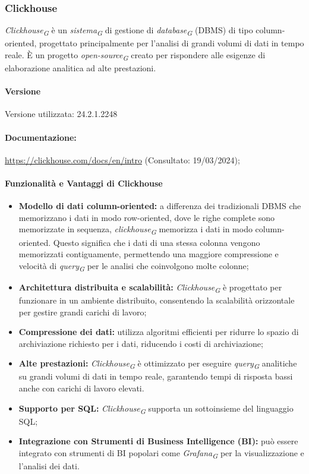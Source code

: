 \subsubsection{Clickhouse} \label{sec:clickHouse}
\textit{Clickhouse}\textsubscript{\textit{G}} è un \textit{sistema}\textsubscript{\textit{G}} di gestione di \textit{database}\textsubscript{\textit{G}} (DBMS) di tipo column-oriented, progettato principalmente per l'analisi di grandi volumi di dati in tempo reale. È un progetto \textit{open-source}\textsubscript{\textit{G}} creato per rispondere alle esigenze di elaborazione analitica ad alte prestazioni.

\paragraph{Versione}
Versione utilizzata: 24.2.1.2248
\paragraph{Documentazione:}
\url{https://clickhouse.com/docs/en/intro} (Consultato: 19/03/2024);

\paragraph{Funzionalità e Vantaggi di Clickhouse}
\begin{itemize}
    \item \textbf{Modello di dati column-oriented:} a differenza dei tradizionali DBMS che memorizzano i dati in modo row-oriented, dove le righe complete sono memorizzate in sequenza, \textit{clickhouse}\textsubscript{\textit{G}} memorizza i dati in modo column-oriented. Questo significa che i dati di una stessa colonna vengono memorizzati contiguamente, permettendo una maggiore compressione e velocità di \textit{query}\textsubscript{\textit{G}} per le analisi che coinvolgono molte colonne;
    \item \textbf{Architettura distribuita e scalabilità:} \textit{Clickhouse}\textsubscript{\textit{G}} è progettato per funzionare in un ambiente distribuito, consentendo la scalabilità orizzontale per gestire grandi carichi di lavoro;
    \item \textbf{Compressione dei dati:} utilizza algoritmi efficienti per ridurre lo spazio di archiviazione richiesto per i dati, riducendo i costi di archiviazione;
    \item \textbf{Alte prestazioni:} \textit{Clickhouse}\textsubscript{\textit{G}} è ottimizzato per eseguire \textit{query}\textsubscript{\textit{G}} analitiche su grandi volumi di dati in tempo reale, garantendo tempi di risposta bassi anche con carichi di lavoro elevati.
    \item \textbf{Supporto per SQL:} \textit{Clickhouse}\textsubscript{\textit{G}} supporta un sottoinsieme del linguaggio SQL;
    \item \textbf{Integrazione con Strumenti di Business Intelligence (BI):} può essere integrato con strumenti di BI popolari come \textit{Grafana}\textsubscript{\textit{G}} per la visualizzazione e l'analisi dei dati.
\end{itemize}


